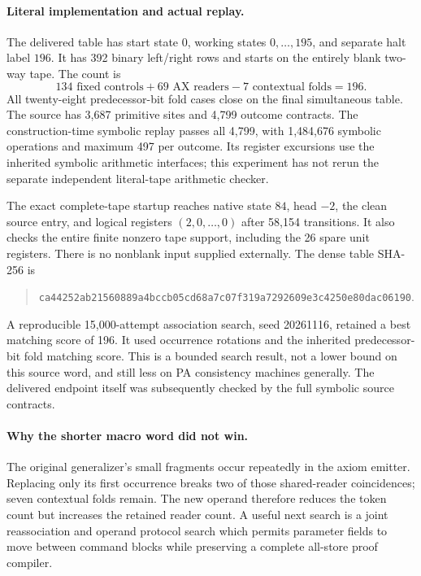 \paragraph{Literal implementation and actual replay.}
The delivered table has start state \(0\), working states
\(0,\ldots,195\), and separate halt label \(196\).  It has 392 binary
left/right rows and starts on the entirely blank two-way tape.
The count is
\[
  134\text{ fixed controls}+69\text{ AX readers}
       -7\text{ contextual folds}=196.
\]
All twenty-eight predecessor-bit fold cases close on the final
simultaneous table.  The source has 3,687 primitive sites and 4,799
outcome contracts.  The construction-time symbolic replay passes
all 4,799, with 1,484,676 symbolic operations and maximum 497 per
outcome.  Its register excursions use the inherited symbolic
arithmetic interfaces; this experiment has not rerun the separate
independent literal-tape arithmetic checker.

The exact complete-tape startup reaches native state \(84\), head
\(-2\), the clean source entry, and logical registers
\((2,0,\ldots,0)\) after 58,154 transitions.  It also checks the
entire finite nonzero tape support, including the 26 spare unit
registers.  There is no nonblank input supplied externally.
The dense table SHA-256 is
\begin{quote}\small
\texttt{ca44252ab21560889a4bccb05cd68a7c07f319a7292609e3c4250e80dac06190}.
\end{quote}

A reproducible 15,000-attempt association search, seed 20261116,
retained a best matching score of 196.  It used occurrence rotations
and the inherited predecessor-bit fold matching score.  This is
a bounded search result, not a lower bound on this source word,
and still less on PA consistency machines generally.
The delivered endpoint itself was subsequently checked by the
full symbolic source contracts.

\paragraph{Why the shorter macro word did not win.}
The original generalizer's small fragments occur repeatedly in the
axiom emitter.  Replacing only its first occurrence breaks two of
those shared-reader coincidences; seven contextual folds remain.
The new operand therefore reduces the token count but increases
the retained reader count.  A useful next search is a joint
reassociation and operand protocol search which permits parameter
fields to move between command blocks while preserving a complete
all-store proof compiler.

